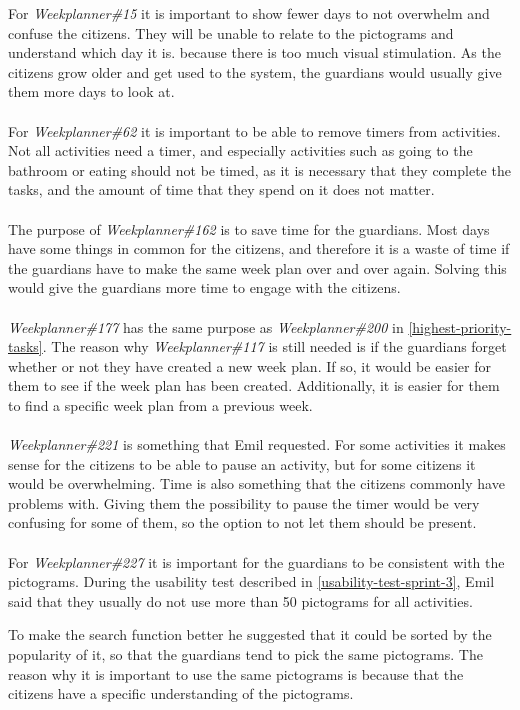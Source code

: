 For \textit{Weekplanner\#15} it is important to show fewer days to not overwhelm and confuse the citizens.
They will be unable to relate to the pictograms and understand which day it is. because there is too much visual stimulation.
As the citizens grow older and get used to the system, the guardians would usually give them more days to look at.
\\\\
For \textit{Weekplanner\#62} it is important to be able to remove timers from activities. 
Not all activities need a timer, and especially activities such as going to the bathroom or eating should not be timed, as it is necessary that they complete the tasks, and the amount of time that they spend on it does not matter.
\\\\
The purpose of \textit{Weekplanner\#162} is to save time for the guardians. 
Most days have some things in common for the citizens, and therefore it is a waste of time if the guardians have to make the same week plan over and over again.
Solving this would give the guardians more time to engage with the citizens.
\\\\
\textit{Weekplanner\#177} has the same purpose as \textit{Weekplanner\#200} in \autoref{highest-priority-tasks}. 
The reason why \textit{Weekplanner\#117} is still needed is if the guardians forget whether or not they have created a new week plan.
If so, it would be easier for them to see if the week plan has been created.
Additionally, it is easier for them to find a specific week plan from a previous week.
\\\\
\textit{Weekplanner\#221} is something that Emil requested. 
For some activities it makes sense for the citizens to be able to pause an activity, but for some citizens it would be overwhelming.
Time is also something that the citizens commonly have problems with. 
Giving them the possibility to pause the timer would be very confusing for some of them, so the option to not let them should be present.
\\\\
For \textit{Weekplanner\#227} it is important for the guardians to be consistent with the pictograms.
During the usability test described in \autoref{usability-test-sprint-3}, Emil said that they usually do not use more than 50 pictograms for all activities.

To make the search function better he suggested that it could be sorted by the popularity of it, so that the guardians tend to pick the same pictograms.
The reason why it is important to use the same pictograms is because that the citizens have a specific understanding of the pictograms.

